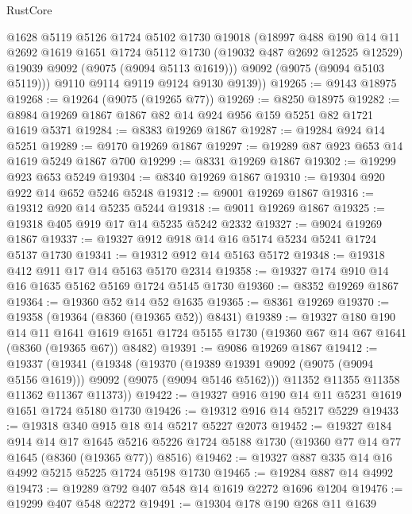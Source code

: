 \begin{lexlean}{RustCore}
\begin{coremodule}
          @1628
          @5119
          @5126
          @1724
          @5102
          @1730
          @19018
          (@18997
            @488
            @190
            @14
            @11
            @2692
            @1619
            @1651
            @1724
            @5112
            @1730
            (@19032 @487 @2692 @12525 @12529)
            @19039
            @9092
            (@9075 (@9094 @5113 @1619)))
          @9092
          (@9075 (@9094 @5103 @5119)))
        @9110
        @9114
        @9119
        @9124
        @9130
        @9139))
@19265 := @9143 @18975
@19268 := @19264 (@9075 (@19265 @77))
@19269 := @8250 @18975
@19282 := @8984 @19269 @1867 @1867 @82 @14 @924 @956 @159 @5251 @82 @1721 @1619 @5371
@19284 := @8383 @19269 @1867
@19287 := @19284 @924 @14 @5251
@19289 := @9170 @19269 @1867
@19297 := @19289 @87 @923 @653 @14 @1619 @5249 @1867 @700
@19299 := @8331 @19269 @1867
@19302 := @19299 @923 @653 @5249
@19304 := @8340 @19269 @1867
@19310 := @19304 @920 @922 @14 @652 @5246 @5248
@19312 := @9001 @19269 @1867
@19316 := @19312 @920 @14 @5235 @5244
@19318 := @9011 @19269 @1867
@19325 := @19318 @405 @919 @17 @14 @5235 @5242 @2332
@19327 := @9024 @19269 @1867
@19337 := @19327 @912 @918 @14 @16 @5174 @5234 @5241 @1724 @5137 @1730
@19341 := @19312 @912 @14 @5163 @5172
@19348 := @19318 @412 @911 @17 @14 @5163 @5170 @2314
@19358 := @19327 @174 @910 @14 @16 @1635 @5162 @5169 @1724 @5145 @1730
@19360 := @8352 @19269 @1867
@19364 := @19360 @52 @14 @52 @1635
@19365 := @8361 @19269
@19370 := @19358 (@19364 (@8360 (@19365 @52)) @8431)
@19389 := @19327
    @180
    @190
    @14
    @11
    @1641
    @1619
    @1651
    @1724
    @5155
    @1730
    (@19360 @67 @14 @67 @1641 (@8360 (@19365 @67)) @8482)
@19391 := @9086 @19269 @1867
@19412 := @19337
    (@19341
      (@19348
        (@19370 (@19389 @19391 @9092 (@9075 (@9094 @5156 @1619))) @9092 (@9075 (@9094 @5146 @5162)))
        @11352
        @11355
        @11358
        @11362
        @11367
        @11373))
@19422 := @19327 @916 @190 @14 @11 @5231 @1619 @1651 @1724 @5180 @1730
@19426 := @19312 @916 @14 @5217 @5229
@19433 := @19318 @340 @915 @18 @14 @5217 @5227 @2073
@19452 := @19327
    @184
    @914
    @14
    @17
    @1645
    @5216
    @5226
    @1724
    @5188
    @1730
    (@19360 @77 @14 @77 @1645 (@8360 (@19365 @77)) @8516)
@19462 := @19327 @887 @335 @14 @16 @4992 @5215 @5225 @1724 @5198 @1730
@19465 := @19284 @887 @14 @4992
@19473 := @19289 @792 @407 @548 @14 @1619 @2272 @1696 @1204
@19476 := @19299 @407 @548 @2272
@19491 := @19304
    @178
    @190
    @268
    @11
    @1639

\end{coremodule}
\end{lexlean}
